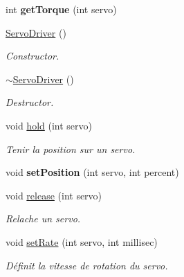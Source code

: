 \begin{DoxyCompactItemize}
int {\bfseries get\+Torque} (int servo)
\item 
\mbox{\label{classServoDriver_a2076bae148e26ee3f854f1f1984d9714}} 
\hyperlink{classServoDriver_a2076bae148e26ee3f854f1f1984d9714}{Servo\+Driver} ()
\begin{DoxyCompactList}\small\item\em Constructor. \end{DoxyCompactList}\item 
\mbox{\label{classServoDriver_acf6cad7d5b891fbe4ff44eaec8409db7}} 
\hyperlink{classServoDriver_acf6cad7d5b891fbe4ff44eaec8409db7}{$\sim$\+Servo\+Driver} ()
\begin{DoxyCompactList}\small\item\em Destructor. \end{DoxyCompactList}\item 
\mbox{\label{classServoDriver_af580283b3d1765c9a27276e9a870cf88}} 
void \hyperlink{classServoDriver_af580283b3d1765c9a27276e9a870cf88}{hold} (int servo)
\begin{DoxyCompactList}\small\item\em Tenir la position sur un servo. \end{DoxyCompactList}\item 
\mbox{\label{classServoDriver_aa9fd898a3e7de526015846f79309dca5}} 
void {\bfseries set\+Position} (int servo, int percent)
\item 
\mbox{\label{classServoDriver_aa1040b0db7ed851aec70a122301fe665}} 
void \hyperlink{classServoDriver_aa1040b0db7ed851aec70a122301fe665}{release} (int servo)
\begin{DoxyCompactList}\small\item\em Relache un servo. \end{DoxyCompactList}\item 
\mbox{\label{classServoDriver_a27d45f075f5fb2333937ab253a8cce6c}} 
void \hyperlink{classServoDriver_a27d45f075f5fb2333937ab253a8cce6c}{set\+Rate} (int servo, int millisec)
\begin{DoxyCompactList}\small\item\em Définit la vitesse de rotation du servo. \end{DoxyCompactList}\item 

\end{DoxyCompactItemize}
